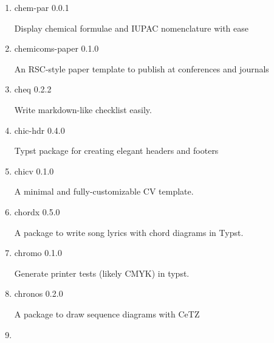 \begin{enumerate}
  { cheda-seu-thesis } { 0.3.0 }

  ä¸œå?---å¤§å­¦æœ¬ç§`æ¯•è®¾ä¸Žç~''ç©¶ç''Ÿå­¦ä½?è®ºæ--‡æ¨¡æ?¿ã€‚UNOFFICIAL
  Southeast University Thesis.
\item
  \href{/universe/package/chem-par/}{}

  { chem-par } { 0.0.1 }

  Display chemical formulae and IUPAC nomenclature with ease
\item
  \href{/universe/package/chemicoms-paper/}{}


  { chemicoms-paper } { 0.1.0 }

  An RSC-style paper template to publish at conferences and journals
\item
  \href{/universe/package/cheq/}{}

  { cheq } { 0.2.2 }

  Write markdown-like checklist easily.
\item
  \href{/universe/package/chic-hdr/}{}

  { chic-hdr } { 0.4.0 }

  Typst package for creating elegant headers and footers
\item
  \href{/universe/package/chicv/}{}


  { chicv } { 0.1.0 }

  A minimal and fully-customizable CV template.
\item
  \href{/universe/package/chordx/}{}

  { chordx } { 0.5.0 }

  A package to write song lyrics with chord diagrams in Typst.
\item
  \href{/universe/package/chromo/}{}

  { chromo } { 0.1.0 }

  Generate printer tests (likely CMYK) in typst.
\item
  \href{/universe/package/chronos/}{}

  { chronos } { 0.2.0 }

  A package to draw sequence diagrams with CeTZ
\item
  \href{/universe/package/chuli-cv/}{}


\end{enumerate}
